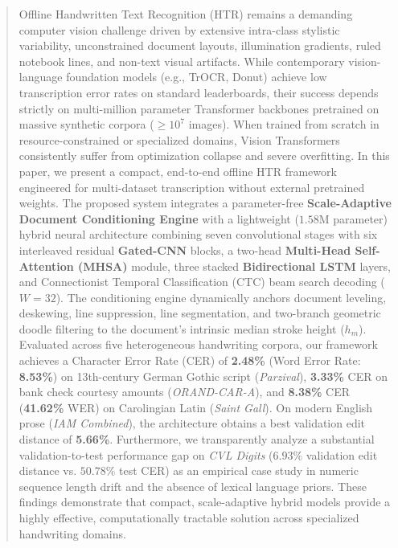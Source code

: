 \documentclass{IEEEtran}
\begin{document}
\begin{abstract}

Offline Handwritten Text Recognition (HTR) remains a demanding computer vision challenge driven by extensive intra-class stylistic variability, unconstrained document layouts, illumination gradients, ruled notebook lines, and non-text visual artifacts. While contemporary vision-language foundation models (e.g., TrOCR, Donut) achieve low transcription error rates on standard leaderboards, their success depends strictly on multi-million parameter Transformer backbones pretrained on massive synthetic corpora ($\ge 10^7$ images). When trained from scratch in resource-constrained or specialized domains, Vision Transformers consistently suffer from optimization collapse and severe overfitting. In this paper, we present a compact, end-to-end offline HTR framework engineered for multi-dataset transcription without external pretrained weights. The proposed system integrates a parameter-free \textbf{Scale-Adaptive Document Conditioning Engine} with a lightweight ($1.58\text{M}$ parameter) hybrid neural architecture combining seven convolutional stages with six interleaved residual \textbf{Gated-CNN} blocks, a two-head \textbf{Multi-Head Self-Attention (MHSA)} module, three stacked \textbf{Bidirectional LSTM} layers, and Connectionist Temporal Classification (CTC) beam search decoding ($W=32$). The conditioning engine dynamically anchors document leveling, deskewing, line suppression, line segmentation, and two-branch geometric doodle filtering to the document's intrinsic median stroke height ($h_m$). Evaluated across five heterogeneous handwriting corpora, our framework achieves a Character Error Rate (CER) of \textbf{2.48\%} (Word Error Rate: \textbf{8.53\%}) on 13th-century German Gothic script (\emph{Parzival}), \textbf{3.33\%} CER on bank check courtesy amounts (\emph{ORAND-CAR-A}), and \textbf{8.38\%} CER (\textbf{41.62\%} WER) on Carolingian Latin (\emph{Saint Gall}). On modern English prose (\emph{IAM Combined}), the architecture obtains a best validation edit distance of \textbf{5.66\%}. Furthermore, we transparently analyze a substantial validation-to-test performance gap on \emph{CVL Digits} ($6.93\%$ validation edit distance vs. $50.78\%$ test CER) as an empirical case study in numeric sequence length drift and the absence of lexical language priors. These findings demonstrate that compact, scale-adaptive hybrid models provide a highly effective, computationally tractable solution across specialized handwriting domains.

\end{abstract}
\end{document}
